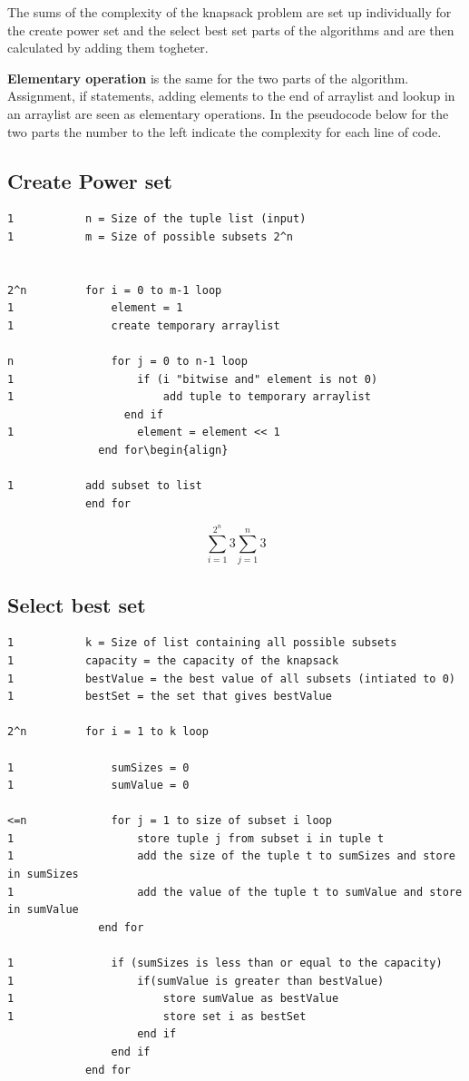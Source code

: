 \documentclass{inc/mas}
\begin{document}
The sums of the complexity of the knapsack problem are set up individually for the create power set and the select best set parts of the algorithms and are then calculated by adding them togheter.

\textbf{Elementary operation} is the same for the two parts of the algorithm. Assignment, if statements, adding elements to the end of arraylist and lookup in an arraylist are seen as elementary operations. In the pseudocode below for the two parts the number to the left indicate the complexity for each line of code.

\subsection{Create Power set}

\begin{lstlisting}
1			n = Size of the tuple list (input)
1			m = Size of possible subsets 2^n


2^n			for i = 0 to m-1 loop	
1				element = 1	
1				create temporary arraylist
	  
n				for j = 0 to n-1 loop	
1					if (i "bitwise and" element is not 0)
1						add tuple to temporary arraylist
				  end if
1					element = element << 1
			  end for\begin{align}
	
1			add subset to list
			end for
\end{lstlisting}

\begin{equation}
\sum^{2^n}_{i =1}3\sum^n_{j=1}3%
\end{equation}


\subsection{Select best set}

\begin{lstlisting}
1			k = Size of list containing all possible subsets
1			capacity = the capacity of the knapsack
1			bestValue = the best value of all subsets (intiated to 0)
1			bestSet = the set that gives bestValue

2^n			for i = 1 to k loop

1				sumSizes = 0
1				sumValue = 0

<=n				for j = 1 to size of subset i loop
1					store tuple j from subset i in tuple t
1					add the size of the tuple t to sumSizes and store in sumSizes
1					add the value of the tuple t to sumValue and store in sumValue
			  end for

1				if (sumSizes is less than or equal to the capacity)
1					if(sumValue is greater than bestValue)
1						store sumValue as bestValue
1						store set i as bestSet
					end if
				end if
			end for
\end{lstlisting}
\end{document}
